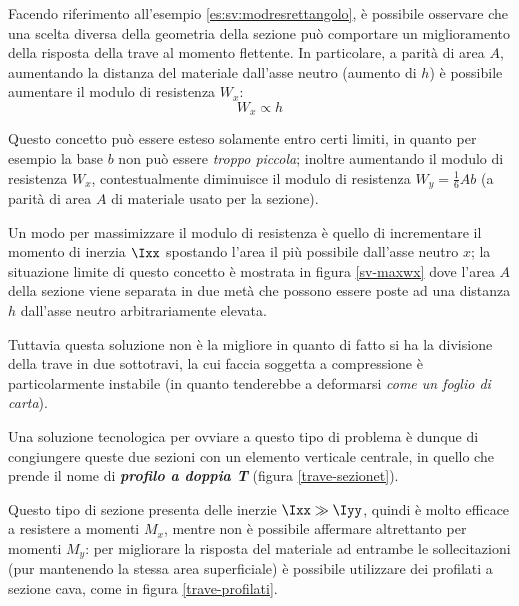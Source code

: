 		Facendo riferimento all'esempio \ref{es:sv:modresrettangolo}, è possibile osservare che una scelta diversa della geometria della sezione può comportare un miglioramento della risposta della trave al momento flettente. In particolare, a parità di area $A$, aumentando la distanza del materiale dall'asse neutro (aumento di $h$) è possibile aumentare il modulo di resistenza $W_x$:
		\[ W_x \propto h  \]
		\begin{nota}
			Questo concetto può essere esteso solamente entro certi limiti, in quanto per esempio la base $b$ non può essere \textit{troppo piccola}; inoltre aumentando il modulo di resistenza $W_x$, contestualmente diminuisce il modulo di resistenza $W_y = \frac 1 6 A b$ (a parità di area $A$ di materiale usato per la sezione).
		\end{nota}
		Un modo per massimizzare il modulo di resistenza è quello di incrementare il momento di inerzia $\Ixx$ spostando l'area il più possibile dall'asse neutro $x$; la situazione limite di questo concetto è mostrata in figura \ref{sv-maxwx} dove l'area $A$ della sezione viene separata in due metà che possono essere poste ad una distanza $h$ dall'asse neutro arbitrariamente elevata.
		
		Tuttavia questa soluzione non è la migliore in quanto di fatto si ha la divisione della trave in due sottotravi, la cui faccia soggetta a compressione è particolarmente instabile (in quanto tenderebbe a deformarsi \textit{come un foglio di carta}).
		
		
		Una soluzione tecnologica per ovviare a questo tipo di problema è dunque di congiungere queste due sezioni con un elemento verticale centrale, in quello che prende il nome di \textbf{\textit{profilo a doppia T}} (figura \ref{trave-sezionet}).
		
		
		Questo tipo di sezione presenta delle inerzie $\Ixx \gg \Iyy$, quindi è molto efficace a resistere a momenti $M_x$, mentre non è possibile affermare altrettanto per momenti $M_y$: per migliorare la risposta del materiale ad entrambe le sollecitazioni (pur mantenendo la stessa area superficiale) è possibile utilizzare dei profilati a sezione cava, come in figura \ref{trave-profilati}.
		
